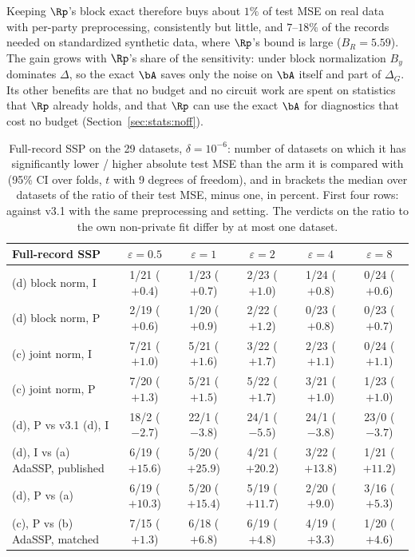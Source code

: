 Keeping $\Rp$'s block exact therefore buys about $1\%$ of test MSE on real data with per-party preprocessing, consistently but little, and $7$--$18\%$ of the records needed on standardized synthetic data, where $\Rp$'s bound is large ($B_R = 5.59$). The gain grows with $\Rp$'s share of the sensitivity: under block normalization $B_y$ dominates $\Delta$, so the exact $\bA$ saves only the noise on $\bA$ itself and part of $\Delta_G$. Its other benefits are that no budget and no circuit work are spent on statistics that $\Rp$ already holds, and that $\Rp$ can use the exact $\bA$ for diagnostics that cost no budget (Section~\ref{sec:stats:noff}).

\begin{table}[t]
  \centering
  \small
  \caption{Full-record SSP on the 29 datasets, $\delta = 10^{-6}$: number of datasets on which it has significantly lower / higher absolute test MSE than the arm it is compared with (95\% CI over folds, $t$ with 9 degrees of freedom), and in brackets the median over datasets of the ratio of their test MSE, minus one, in percent. First four rows: against v3.1 with the same preprocessing and setting. The verdicts on the ratio to the own non-private fit differ by at most one dataset.}
  \label{tab:full_verdicts}
  \footnotesize
  \setlength{\tabcolsep}{3.5pt}
  \begin{tabular}{@{}lccccc@{}}
    \toprule
    Full-record SSP & $\varepsilon = 0.5$ & $\varepsilon = 1$ & $\varepsilon = 2$ & $\varepsilon = 4$ & $\varepsilon = 8$ \\
    \midrule
    (d) block norm, I & 1/21 ($+0.4$) & 1/23 ($+0.7$) & 2/23 ($+1.0$) & 1/24 ($+0.8$) & 0/24 ($+0.6$) \\
    (d) block norm, P & 2/19 ($+0.6$) & 1/20 ($+0.9$) & 2/22 ($+1.2$) & 0/23 ($+0.8$) & 0/23 ($+0.7$) \\
    (c) joint norm, I & 7/21 ($+1.0$) & 5/21 ($+1.6$) & 3/22 ($+1.7$) & 2/23 ($+1.1$) & 0/24 ($+1.1$) \\
    (c) joint norm, P & 7/20 ($+1.3$) & 5/21 ($+1.5$) & 5/22 ($+1.7$) & 3/21 ($+1.0$) & 1/23 ($+1.0$) \\
    (d), P vs v3.1 (d), I & 18/2 ($-2.7$) & 22/1 ($-3.8$) & 24/1 ($-5.5$) & 24/1 ($-3.8$) & 23/0 ($-3.7$) \\
    (d), I vs (a) AdaSSP, published & 6/19 ($+15.6$) & 5/20 ($+25.9$) & 4/21 ($+20.2$) & 3/22 ($+13.8$) & 1/21 ($+11.2$) \\
    (d), P vs (a) & 6/19 ($+10.3$) & 5/20 ($+15.4$) & 5/19 ($+11.7$) & 2/20 ($+9.0$) & 3/16 ($+5.3$) \\
    (c), P vs (b) AdaSSP, matched & 7/15 ($+1.3$) & 6/18 ($+6.8$) & 6/19 ($+4.8$) & 4/19 ($+3.3$) & 1/20 ($+4.6$) \\
    \bottomrule
  \end{tabular}
\end{table}

